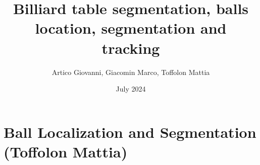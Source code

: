 \documentclass{article}
\title{Billiard table segmentation, balls location, segmentation and tracking
}
\author{Artico Giovanni, Giacomin Marco, Toffolon Mattia}
\date{July 2024}
\begin{document}
\maketitle

% 
% 
% 
% 
% 

\section*{Ball Localization and Segmentation (Toffolon Mattia)}

\end{document}
